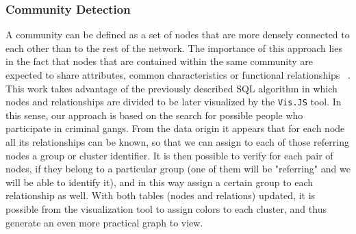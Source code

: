 \subsubsection{Community Detection}
A community can be defined as a set of nodes that are more densely connected to each other than to the rest of the network. The importance of this approach lies in the fact that nodes that are contained within the same community are expected to share attributes, common characteristics or functional relationships ~\cite{ma2014exploring}.
This work takes advantage of the previously described SQL algorithm in which nodes and relationships are divided to be later visualized by the \texttt{Vis.JS} tool.
In this sense, our approach is based on the search for possible people who participate in criminal gangs. From the data origin it appears that for each node all its relationships can be known, so that we can assign to each of those referring nodes a group or cluster identifier.
It is then possible to verify for each pair of nodes, if they belong to a particular group (one of them will be "referring" and we will be able to identify it), and in this way assign a certain group to each relationship as well. With both tables (nodes and relations) updated, it is possible from the visualization tool to assign colors to each cluster, and thus generate an even more practical graph to view.

